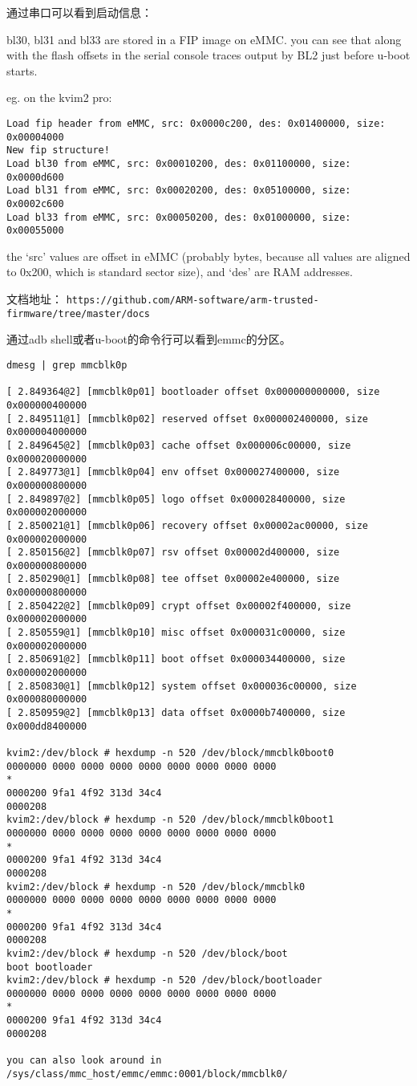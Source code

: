 通过串口可以看到启动信息：


bl30, bl31 and bl33 are stored in a FIP image on eMMC.
you can see that along with the flash offsets in the serial 
console traces output by BL2 just before u-boot starts.

eg. on the kvim2 pro:
\begin{verbatim}
Load fip header from eMMC, src: 0x0000c200, des: 0x01400000, size: 0x00004000
New fip structure!
Load bl30 from eMMC, src: 0x00010200, des: 0x01100000, size: 0x0000d600
Load bl31 from eMMC, src: 0x00020200, des: 0x05100000, size: 0x0002c600
Load bl33 from eMMC, src: 0x00050200, des: 0x01000000, size: 0x00055000
\end{verbatim}
the ‘src’ values are offset in eMMC (probably bytes, because all
values are aligned to 0x200, which is standard sector size), and
‘des’ are RAM addresses.

文档地址：
\verb|https://github.com/ARM-software/arm-trusted-firmware/tree/master/docs|

通过adb shell或者u-boot的命令行可以看到emmc的分区。

\begin{verbatim}
dmesg | grep mmcblk0p

[ 2.849364@2] [mmcblk0p01] bootloader offset 0x000000000000, size 0x000000400000
[ 2.849511@1] [mmcblk0p02] reserved offset 0x000002400000, size 0x000004000000
[ 2.849645@2] [mmcblk0p03] cache offset 0x000006c00000, size 0x000020000000
[ 2.849773@1] [mmcblk0p04] env offset 0x000027400000, size 0x000000800000
[ 2.849897@2] [mmcblk0p05] logo offset 0x000028400000, size 0x000002000000
[ 2.850021@1] [mmcblk0p06] recovery offset 0x00002ac00000, size 0x000002000000
[ 2.850156@2] [mmcblk0p07] rsv offset 0x00002d400000, size 0x000000800000
[ 2.850290@1] [mmcblk0p08] tee offset 0x00002e400000, size 0x000000800000
[ 2.850422@2] [mmcblk0p09] crypt offset 0x00002f400000, size 0x000002000000
[ 2.850559@1] [mmcblk0p10] misc offset 0x000031c00000, size 0x000002000000
[ 2.850691@2] [mmcblk0p11] boot offset 0x000034400000, size 0x000002000000
[ 2.850830@1] [mmcblk0p12] system offset 0x000036c00000, size 0x000080000000
[ 2.850959@2] [mmcblk0p13] data offset 0x0000b7400000, size 0x000dd8400000

kvim2:/dev/block # hexdump -n 520 /dev/block/mmcblk0boot0
0000000 0000 0000 0000 0000 0000 0000 0000 0000
*
0000200 9fa1 4f92 313d 34c4
0000208
kvim2:/dev/block # hexdump -n 520 /dev/block/mmcblk0boot1
0000000 0000 0000 0000 0000 0000 0000 0000 0000
*
0000200 9fa1 4f92 313d 34c4
0000208
kvim2:/dev/block # hexdump -n 520 /dev/block/mmcblk0
0000000 0000 0000 0000 0000 0000 0000 0000 0000
*
0000200 9fa1 4f92 313d 34c4
0000208
kvim2:/dev/block # hexdump -n 520 /dev/block/boot
boot bootloader
kvim2:/dev/block # hexdump -n 520 /dev/block/bootloader
0000000 0000 0000 0000 0000 0000 0000 0000 0000
*
0000200 9fa1 4f92 313d 34c4
0000208

you can also look around in /sys/class/mmc_host/emmc/emmc:0001/block/mmcblk0/
\end{verbatim}

